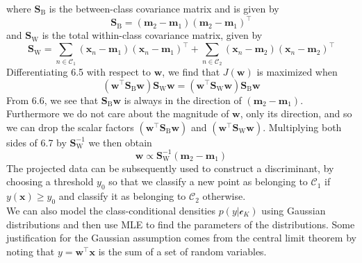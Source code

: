 \documentclass[twoside]{article}
\begin{document}
where $\textbf{S}_\text{B}$ is the between-class covariance matrix and is given by
\begin{equation}
    \textbf{S}_\text{B} = (\boldsymbol{m}_2 - \boldsymbol{m}_1)(\boldsymbol{m}_2 - \boldsymbol{m}_1)^\intercal
\end{equation}
and $\textbf{S}_\text{W}$ is the total within-class covariance matrix, given by
\begin{equation*}
    \textbf{S}_\text{W} = \sum\limits_{n \in \mathcal{C}_1}(\boldsymbol{x}_n - \boldsymbol{m}_1)(\boldsymbol{x}_n - \boldsymbol{m}_1)^\intercal + \sum\limits_{n \in \mathcal{C}_2}(\boldsymbol{x}_n - \boldsymbol{m}_2)(\boldsymbol{x}_n - \boldsymbol{m}_2)^\intercal 
\end{equation*}
Differentiating 6.5 with respect to $\boldsymbol{w}$, we find that $J(\boldsymbol{w})$ is maximized when
\begin{equation}
    (\boldsymbol{w}^\intercal\textbf{S}_\text{B}\boldsymbol{w})\textbf{S}_\text{W}\boldsymbol{w} = (\boldsymbol{w}^\intercal\textbf{S}_\text{W}\boldsymbol{w})\textbf{S}_\text{B}\boldsymbol{w}
\end{equation}
From 6.6, we see that $\textbf{S}_\text{B}\boldsymbol{w}$ is always in the direction of $(\boldsymbol{m}_2 - \boldsymbol{m}_1)$. Furthermore we do not care about the magnitude of $\boldsymbol{w}$, only its direction, and so we can drop the scalar factors $(\boldsymbol{w}^\intercal\textbf{S}_\text{B}\boldsymbol{w})$ and $(\boldsymbol{w}^\intercal\textbf{S}_\text{W}\boldsymbol{w})$. Multiplying both sides of 6.7 by $\textbf{S}_\text{W}^{-1}$ we then obtain
\begin{equation*}
    \boldsymbol{w} \propto \textbf{S}_\text{W}^{-1}(\boldsymbol{m}_2 - \boldsymbol{m}_1)
\end{equation*}
The projected data can be subsequently used to construct a discriminant, by choosing a threshold $y_0$ so that we classify a new point as belonging to $\mathcal{C}_1$ if $y(\boldsymbol{x}) \geq y_0$ and classify it as belonging to $\mathcal{C}_2$ otherwise.\\
We can also model the class-conditional densities $p(y|\mathcal{c}_K)$ using Gaussian distributions and then use MLE to find the parameters of the distributions. Some justification for the Gaussian assumption comes from the central limit theorem by noting that $y = \boldsymbol{w^\intercal x}$ is the sum of a set of random variables.
\newpage
\end{document}
